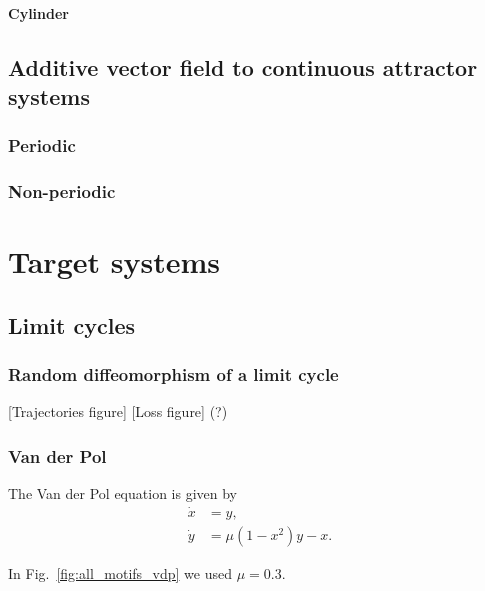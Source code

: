 \documentclass{article}
\theoremstyle{definition} \newtheorem{definition}{Definition}  \newtheorem{example}{Example}
\theoremstyle{remark} \newtheorem{remark}{Remark}
\newcounter{ct}
\begin{document}
\paragraph{Cylinder}



\subsection{Additive vector field to continuous attractor systems}
\subsubsection{Periodic}


\subsubsection{Non-periodic}




\newpage
 \section{Target systems}\label{sec:target_systems}

\subsection{Limit cycles}
\subsubsection{Random diffeomorphism of a limit cycle}
[Trajectories figure]
[Loss figure] (?)


\subsubsection{Van der Pol}
The Van der Pol equation is given by 
\begin{equation}
\begin{aligned}
\dot{x} &= y, \\
\dot{y} &= \mu (1 - x^2) y - x.
\end{aligned}
\end{equation}

In Fig.~\ref{fig:all_motifs_vdp} we used $\mu=0.3$.
\end{document}
